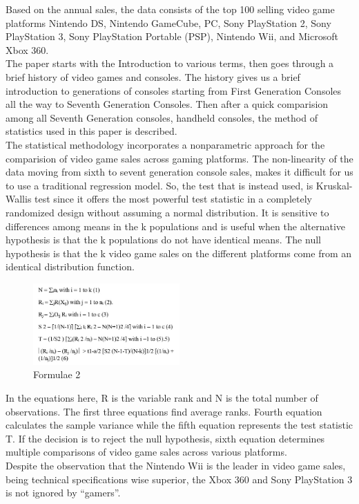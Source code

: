 \documentclass[conference]{IEEEtran}
\begin{document}
Based on the annual sales, the data consists of the top 100 selling video game platforms Nintendo DS, Nintendo GameCube, PC, Sony PlayStation 2, Sony PlayStation 3, Sony PlayStation Portable (PSP), Nintendo Wii, and Microsoft Xbox 360.\\
The paper starts with the Introduction to various terms, then goes through a brief history of video games and consoles. The history gives us a brief introduction to generations of consoles starting from First Generation Consoles all the way to Seventh Generation Consoles. Then after a quick comparision among all Seventh Generation consoles, handheld consoles, the method of statistics used in this paper is described.\\
The statistical methodology incorporates a nonparametric approach for the comparision of video game sales across gaming platforms. The non-linearity of the data moving from sixth to sevent generation console sales, makes it difficult for us to use a traditional regression model. So, the test that is instead used, is Kruskal-Wallis test since it offers the most powerful test statistic in a completely randomized design without assuming a normal distribution. It is sensitive to differences among means in the k populations and is useful when the alternative hypothesis is that the k populations do not have identical means. The null hypothesis is that the k video game sales on the different platforms come from an identical distribution function.\\
\begin{figure}[h]
    \centering
    \includegraphics[width=0.5\textwidth]{L2F1.jpg}
    \caption{Formulae 2}
\end{figure}
In the equations here, R is the variable rank and N is the total number of observations. The first three equations find average ranks. Fourth equation calculates the sample variance while the fifth equation represents the test statistic T. If the decision is to reject the null hypothesis, sixth equation determines multiple comparisons of video game sales across various platforms.\\
Despite the observation that the Nintendo Wii is the leader in video game sales, being technical specifications wise superior, the Xbox 360 and Sony PlayStation 3 is not ignored by ``gamers''.\\
\end{document}
